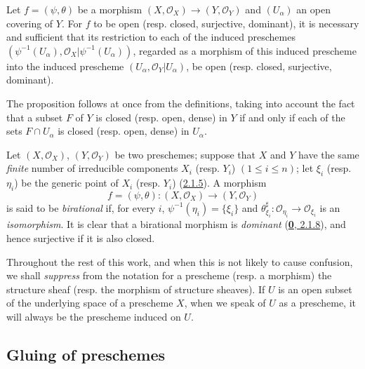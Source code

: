 \begin{proposition}[2.2.8]
\label{I.2.2.8}
Let $f=(\psi,\theta)$ be a morphism
$(X,\mathscr{O}_X)\to(Y,\mathscr{O}_Y)$ and $(U_\alpha)$ an open covering
of $Y$. For $f$ to be open \textup{(resp.} closed, surjective, dominant), it is
necessary and sufficient that its restriction to each of the induced
preschemes $(\psi^{-1}(U_\alpha),\mathscr{O}_X|\psi^{-1}(U_\alpha))$,
regarded as a morphism of this induced prescheme into the induced prescheme
$(U_\alpha,\mathscr{O}_Y|U_\alpha)$, be open \textup{(resp.} closed, surjective,
dominant).
\end{proposition}

The proposition follows at once from the definitions, taking into account
the fact that a subset $F$ of $Y$ is closed (resp. open, dense) in $Y$ if
and only if each of the sets $F\cap U_\alpha$ is closed (resp. open, dense)
in $U_\alpha$.

\begin{env}[2.2.9]
\label{I.2.2.9}
Let $(X,\mathscr{O}_X)$, $(Y,\mathscr{O}_Y)$ be two preschemes; suppose
that $X$ and $Y$ have the same \emph{finite} number of irreducible
components $X_i$ (resp. $Y_i$) $(1\leq i\leq n)$; let $\xi_i$ (resp.
$\eta_i$) be the generic point of $X_i$ (resp. $Y_i$)
(\hyperref[I.2.1.5]{2.1.5}). A morphism
\[
  f=(\psi,\theta):(X,\mathscr{O}_X)\to(Y,\mathscr{O}_Y)
\]
is said to be \emph{birational} if, for every $i$,
$\psi^{-1}(\eta_i)=\{\xi_i\}$ and
$\theta_{\xi_i}^{\sharp}:\mathscr{O}_{\eta_i}\to\mathscr{O}_{\xi_i}$ is an
\emph{isomorphism}. It is clear that a birational morphism is
\emph{dominant} (\hyperref[0.2.1.8]{\textbf{0}, 2.1.8}), and hence surjective if
it is also closed.
\end{env}

\begin{notation}[2.2.10]
\label{I.2.2.10}
Throughout the rest of this work, and when this is not likely to cause
confusion, we shall \emph{suppress} from the notation for a prescheme (resp.
a morphism) the structure sheaf (resp. the morphism of structure sheaves).
If $U$ is an open subset of the underlying space of a prescheme $X$, when we
speak of $U$ as a prescheme, it will always be the prescheme induced on $U$.
\end{notation}

\subsection{Gluing of preschemes}
\label{subsection:I.2.3}

